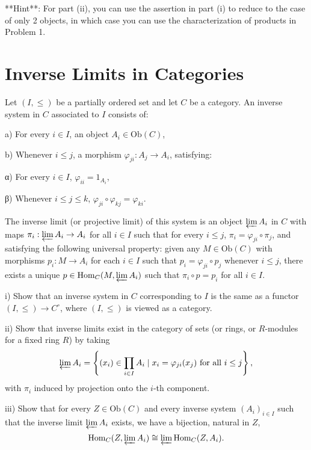 \documentclass[lang=cn,11pt]{template}
\begin{document}
**Hint**: For part (ii), you can use the assertion in part (i) to reduce to the case of only 2 objects, in which case you can use the characterization of products in Problem 1.

\section{Inverse Limits in Categories}
Let \( (I, \leq) \) be a partially ordered set and let \( C \) be a category. An inverse system in \( C \) associated to \( I \) consists of:

a) For every \( i \in I \), an object \( A_i \in \text{Ob}(C) \),

b) Whenever \( i \leq j \), a morphism \( \varphi_{ji} : A_j \rightarrow A_i \), satisfying:

α) For every \( i \in I \), \( \varphi_{ii} = 1_{A_i} \),

β) Whenever \( i \leq j \leq k \), \( \varphi_{ji} \circ \varphi_{kj} = \varphi_{ki} \).

The inverse limit (or projective limit) of this system is an object \( \varprojlim A_i \) in \( C \) with maps \( \pi_i : \varprojlim A_i \rightarrow A_i \) for all \( i \in I \) such that for every \( i \leq j \), \( \pi_i = \varphi_{ji} \circ \pi_j \), and satisfying the following universal property: given any \( M \in \text{Ob}(C) \) with morphisms \( p_i : M \rightarrow A_i \) for each \( i \in I \) such that \( p_i = \varphi_{ji} \circ p_j \) whenever \( i \leq j \), there exists a unique \( p \in \text{Hom}_C(M, \varprojlim A_i) \) such that \( \pi_i \circ p = p_i \) for all \( i \in I \).

i) Show that an inverse system in \( C \) corresponding to \( I \) is the same as a functor \( (I, \leq) \rightarrow C^{\circ} \), where \( (I, \leq) \) is viewed as a category.

ii) Show that inverse limits exist in the category of sets (or rings, or \( R \)-modules for a fixed ring \( R \)) by taking
\[
\varprojlim A_i = \left\{ (x_i) \in \prod_{i \in I} A_i \mid x_i = \varphi_{ji}(x_j) \text{ for all } i \leq j \right\},
\]
with \( \pi_i \) induced by projection onto the \( i \)-th component.

iii) Show that for every \( Z \in \text{Ob}(C) \) and every inverse system \( (A_i)_{i \in I} \) such that the inverse limit \( \varprojlim A_i \) exists, we have a bijection, natural in \( Z \),
\[
\text{Hom}_C(Z, \varprojlim A_i) \cong \varprojlim \text{Hom}_C(Z, A_i).
\]
\end{document}
